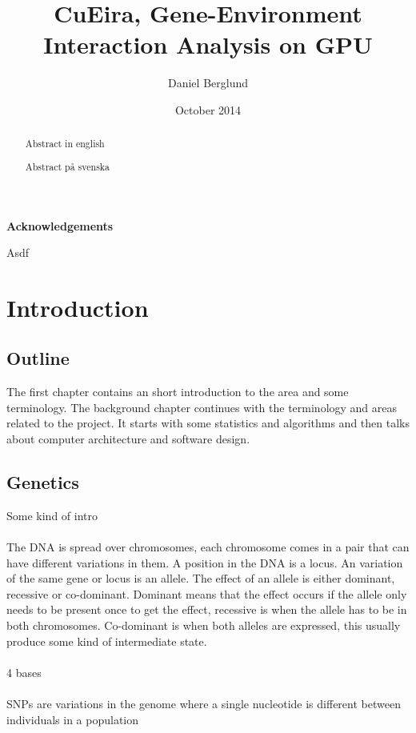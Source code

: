 \documentclass[10pt,a4paper]{report}
\title{CuEira, Gene-Environment Interaction Analysis on GPU}
\author{Daniel Berglund}
\date{October 2014}
\makeatletter
\newcommand\ackname{Acknowledgements}
\newenvironment{acknowledgements}{
      \titlepage
      \null\vfil
      \@beginparpenalty\@lowpenalty
      \begin{center}%
        \bfseries \ackname
        \@endparpenalty\@M
      \end{center}}%
     {\par\vfil\null\endtitlepage}
\newenvironment{acknowledgements}{
      \if@twocolumn
        \section*{\abstractname}
      \else
        \small
        \begin{center}
          {\bfseries \ackname\vspace{-.5em}\vspace{\z@}}
        \end{center}
        \quotation
      \fi}
      {\if@twocolumn\else\endquotation\fi}
\makeatother
\begin{document}
\maketitle
\thispagestyle{empty}

\clearpage
\thispagestyle{empty}
\begin{abstract}
Abstract in english
\end{abstract}

\clearpage
\thispagestyle{empty}
\begin{abstract}
Abstract på svenska
\end{abstract}

\clearpage
\thispagestyle{empty}
\begin{acknowledgements}
Asdf
\end{acknowledgements}

\clearpage
\tableofcontents
\thispagestyle{empty}

\clearpage
\setcounter{page}{1}
\chapter{Introduction}

\section{Outline}
The first chapter contains an short introduction to the area and some terminology. The background chapter continues with the terminology and areas related to the project. It starts with some statistics and algorithms and then talks about computer architecture and software design.


\section{Genetics}
Some kind of intro\\
\\
The DNA is spread over chromosomes, each chromosome comes in a pair that can have different variations in them. A position in the DNA is a locus. An variation of the same gene or locus is an allele. The effect of an allele is either dominant, recessive or co-dominant. Dominant means that the effect occurs if the allele only needs to be present once to get the effect, recessive is when the allele has to be in both chromosomes. Co-dominant is when both alleles are expressed, this usually produce some kind of intermediate state.\cite{sadava_life}\\
\\
4 bases\cite{sadava_life}\\
\\
SNPs are variations in the genome where a single nucleotide is different between individuals in a population\cite{fareed_snp}
\end{document}

